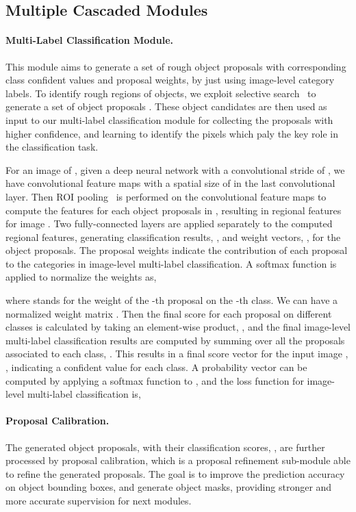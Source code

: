 \documentclass[10pt,twocolumn,letterpaper]{article}
\begin{document}
\subsection{Multiple Cascaded Modules}\label{sec:detection}


\paragraph{Multi-Label Classification Module.} This module aims to generate a set of rough object proposals with corresponding class confident values and proposal weights, by just using image-level category labels.
To identify rough regions of objects, we exploit selective search~\cite{uijlings2013selective} to generate a set of object proposals . These object candidates are then used as input to our multi-label classification module for collecting the proposals with higher confidence, and learning to identify the pixels which paly the key role in the classification task.

For an image  of , given a deep neural network  with a convolutional stride of , we have convolutional feature maps with a spatial size of   in the last convolutional layer.
Then ROI pooling~\cite{girshick2015fast} is performed on the convolutional feature maps to compute the features for each object proposals in ,
resulting in  regional features for image . Two fully-connected layers are applied separately to the computed regional features, generating  classification results, , and weight vectors, , for the  object proposals. The proposal weights indicate the contribution of each proposal to the  categories in image-level multi-label classification. A softmax function is applied to normalize the weights as,


where  stands for the weight of the -th proposal on the -th class. We can have a normalized weight matrix . Then the final score for each proposal on different classes is  calculated by taking an element-wise product, , and the final image-level multi-label classification results are computed by summing over all the proposals associated to each class, . This results in a final score vector for the input image , , indicating a confident value for each class. A probability vector  can be computed by applying a softmax function to , and the loss function for image-level multi-label classification is,



\paragraph{Proposal Calibration.}
The generated object proposals, with their classification scores, , are further processed by proposal calibration, which is a proposal refinement sub-module able to refine the generated proposals. The goal is to improve the prediction accuracy on object bounding boxes, and generate object masks, providing stronger and more accurate supervision for next modules.
\end{document}
